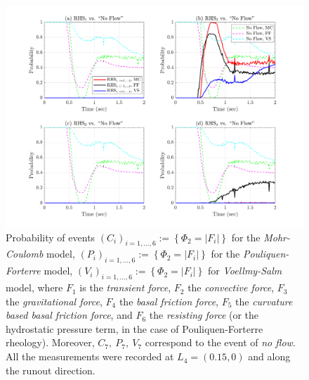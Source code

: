 \documentclass{article}
\begin{document}
\begin{figure}[H]
        \centering
        \includegraphics[width=1\textwidth]{InclinedPlane/Dominance1/DominancePrX_L4.png}
        \caption{Probability of events $(C_i)_{i=1,...,6}:=\left\{\Phi_2=|F_i|\right\}$ for the \emph{Mohr-Coulomb} model, $(P_i)_{i=1,...,6}:=\left\{\Phi_2=|F_i|\right\}$ for the \emph{Pouliquen-Forterre} model, $(V_i)_{i=1,...,6}:=\left\{\Phi_2=|F_i|\right\}$ for \emph{Voellmy-Salm} model, where $F_1$ is the \emph{transient force}, $F_2$ the \emph{convective force}, $F_3$ the \emph{gravitational force}, $F_4$ the \emph{basal friction force}, $F_5$ the \emph{curvature based basal friction force}, and $F_6$ the \emph{resisting force} (or the hydrostatic pressure term, in the case of Pouliquen-Forterre rheology). Moreover, $C_7,\ P_7,\ V_7$ correspond to the event of \emph{no flow}. All the measurements were recorded at $L_4=(0.15,0)$ and along the runout direction.}
        \label{fig:Ramp-FXDominance1-L4}
\end{figure}
\end{document}

